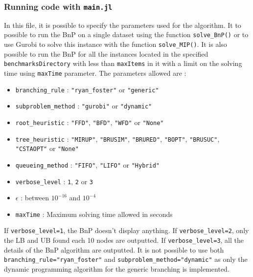 \subsubsection{Running code with \texttt{main.jl}}
In this file, it is possible to specify the parameters used for the algorithm. It to possible to run the BnP on a single dataset using the function \texttt{solve\_BnP()} or to use Gurobi to solve this instance with the function \texttt{solve\_MIP()}. It is also possible to run the BnP for all the instances located in the specified \texttt{benchmarksDirectory} with less than \texttt{maxItems} in it with a limit on the solving time using \texttt{maxTime} parameter. The parameters allowed are :
\begin{itemize}
	\item \texttt{branching\_rule} : \texttt{"ryan\_foster"} or \texttt{"generic"}
	\item \texttt{subproblem\_method} : \texttt{"gurobi"} or \texttt{"dynamic"}
	\item \texttt{root\_heuristic} : \texttt{"FFD"}, \texttt{"BFD"}, \texttt{"WFD"} or \texttt{"None"}
	\item \texttt{tree\_heuristic} : \texttt{"MIRUP"}, \texttt{"BRUSIM"}, \texttt{"BRURED"}, \texttt{"BOPT"}, \texttt{"BRUSUC"}, \texttt{"CSTAOPT"} or \texttt{"None"}
	\item \texttt{queueing\_method} : \texttt{"FIFO"}, \texttt{"LIFO"} or \texttt{"Hybrid"}
	\item \texttt{verbose\_level} : \texttt{1}, \texttt{2} or \texttt{3}
	\item \texttt{$\epsilon$} : between $10^{-16}$ and $10^{-4}$
	\item \texttt{maxTime} : Maximum solving time allowed in seconds
\end{itemize}
If \texttt{verbose\_level=1}, the BnP doesn't display anything. If \texttt{verbose\_level=2}, only the LB and UB found each 10 nodes are outputted. If \texttt{verbose\_level=3}, all the details of the BnP algorithm are outputted. It is not possible to use both \texttt{branching\_rule="ryan\_foster"} and \texttt{subproblem\_method="dynamic"} as only the dynamic programming algorithm for the generic branching is implemented.